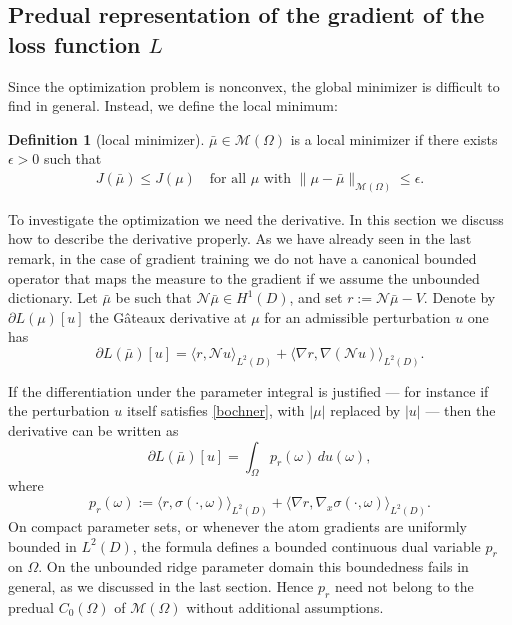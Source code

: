 \documentclass[11pt]{amsart}
\theoremstyle{definition}
\newtheorem{definition}[theorem]{Definition}
\theoremstyle{remark}
\begin{document}
\subsection{Predual representation of the gradient of the loss function \texorpdfstring{$L$}{L}}
Since the optimization problem is nonconvex, the global minimizer is difficult to find in general. 
Instead, we define the local minimum: 
\begin{definition}[local minimizer]
$\bar{\mu} \in \mathcal{M}(\Omega)$ is a local minimizer if there exists $\epsilon > 0$ such that 
\begin{align*}
	J(\bar{\mu}) \le J(\mu) \quad \text{for all } \mu \text{ with }  \|\mu - \bar{\mu}\|_{\mathcal{M}(\Omega)} \le \epsilon. 
\end{align*}
\end{definition}

To investigate the optimization we need the derivative. 
In this section we discuss how to describe the derivative properly. 
As we have already seen in the last remark, in the case of gradient training we do not have a canonical bounded operator that maps the measure to the gradient if we assume the unbounded dictionary. 
Let $\bar{\mu}$ be such that $\mathcal{N}\bar{\mu}\in H^1(D)$, and set $r := \mathcal{N}\bar{\mu}-V$. 
Denote by $\partial L (\mu)[u]$ the G\^ateaux derivative at $\mu$ for an admissible perturbation $u$ one has
\begin{equation}
\partial L(\bar{\mu})[u]
=
\langle r,\mathcal{N}u\rangle_{L^2(D)}
+
\langle \nabla r,\nabla(\mathcal{N}u)\rangle_{L^2(D)} .
\end{equation}
 
If the differentiation under the parameter integral
is justified --- for instance if the perturbation $u$ itself satisfies \eqref{bochner}, with $|\mu|$ replaced by $|u|$ --- then the derivative can be written as
\begin{equation*}
\partial L(\bar{\mu})[u]
=
\int_\Omega p_r(\omega)\,du(\omega),
\end{equation*}
where
\begin{equation}
p_r(\omega)
:=
\langle r,\sigma(\cdot,\omega)\rangle_{L^2(D)}
+
\langle \nabla r,\nabla_x\sigma(\cdot,\omega)\rangle_{L^2(D)} .
\end{equation}
On compact parameter sets, or whenever the atom gradients are uniformly bounded
in $L^2(D)$, the formula defines a bounded continuous dual variable $p_r$ on $\Omega$.
On the unbounded ridge parameter domain this boundedness fails in general, as we discussed in the last section.  
Hence $p_r$ need not belong to the predual $C_0(\Omega)$ of $\mathcal{M}(\Omega)$ without additional assumptions. 
\end{document}
